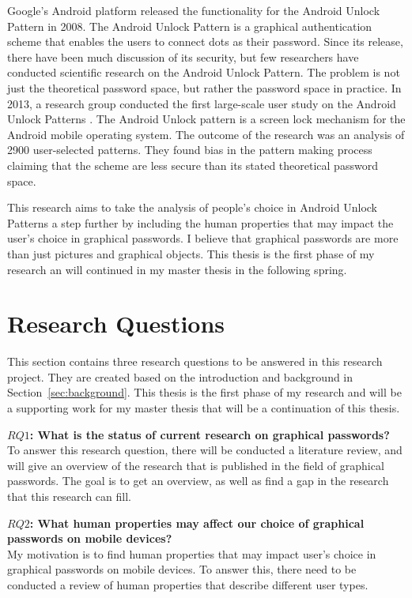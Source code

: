   Google's Android platform released the functionality for the Android Unlock Pattern in 2008. The Android Unlock Pattern is a graphical authentication scheme that enables the users to connect dots as their password. Since its release, there have been much discussion of its security, but few researchers have conducted scientific research on the Android Unlock Pattern. The problem is not just the theoretical password space, but rather the password space in practice. In 2013, a research group conducted the first large-scale user study on the Android Unlock Patterns \cite{Uellenbeck}. The Android Unlock pattern is a screen lock mechanism for the Android mobile operating system. The outcome of the research was an analysis of 2900 user-selected patterns. They found bias in the pattern making process claiming that the scheme are less secure than its stated theoretical password space.

  This research aims to take the analysis of people's choice in Android Unlock Patterns a step further by including the human properties that may impact the user's choice in graphical passwords. I believe that graphical passwords are more than just pictures and graphical objects. This thesis is the first phase of my research an will continued in my master thesis in the following spring.

  \section{Research Questions} \label{sec:researchquestions}
    
  This section contains three research questions to be answered in this research project. They are created based on the introduction and background in Section~\ref{sec:background}. This thesis is the first phase of my research and will be a supporting work for my master thesis that will be a continuation of this thesis.

  {\bf $RQ1$: What is the status of current research on graphical passwords?} \\
  To answer this research question, there will be conducted a literature review, and will give an overview of the research that is published in the field of graphical passwords. The goal is to get an overview, as well as find a gap in the research that this research can fill.

  {\bf $RQ2$: What human properties may affect our choice of graphical passwords on mobile devices?}\\
  My motivation is to find human properties that may impact user's choice in graphical passwords on mobile devices. To answer this, there need to be conducted a review of human properties that describe different user types.

